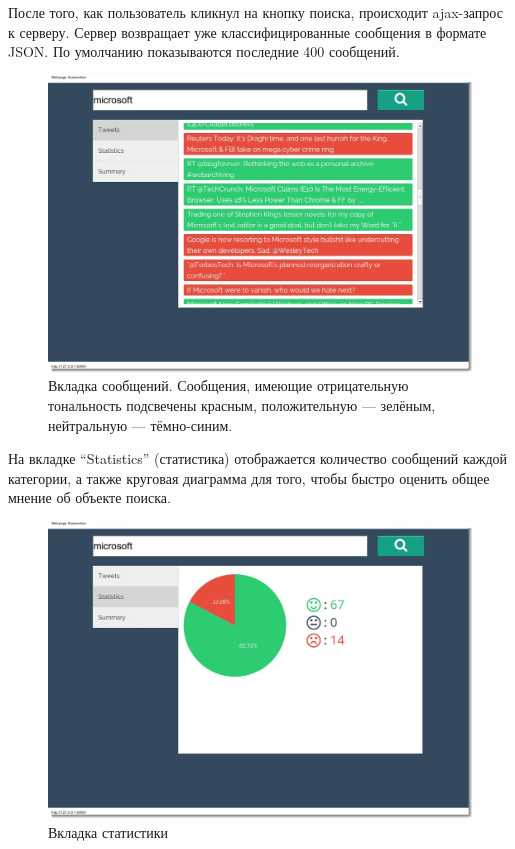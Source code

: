 После того, как пользователь кликнул на кнопку поиска, происходит ajax-запрос
к серверу. Сервер возвращает уже классифицированные сообщения в 
формате JSON. По умолчанию показываются последние 400 сообщений.

\begin{figure}[!ht]
\begin{center}
\includegraphics[scale=0.4, trim=20mm 60mm 20mm 10mm, clip]{../resources/screens/tweets.png}
\caption{Вкладка сообщений. Сообщения, имеющие отрицательную тональность подсвечены красным, положительную --- зелёным, нейтральную --- тёмно-синим.}
\label{gr:messages}
\end{center}
\end{figure} 

На вкладке ``Statistics'' (статистика) отображается количество сообщений каждой категории,
а также круговая диаграмма для того, чтобы быстро оценить общее мнение
об объекте поиска.
\begin{figure}[!ht]
\begin{center}
\includegraphics[scale=0.4, trim=20mm 60mm 20mm 10mm, clip]{../resources/screens/statistics.png}
\caption{Вкладка статистики}
\label{gr:stats}
\end{center}
\end{figure} 


